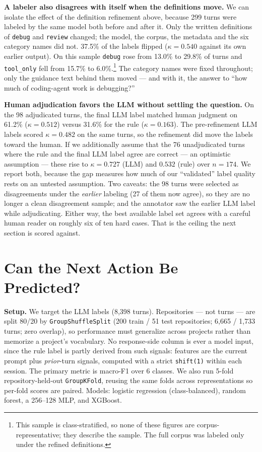 \documentclass[10pt]{article}
\begin{document}
\textbf{A labeler also disagrees with itself when the definitions move.} We can
isolate the effect of the definition refinement above, because 299 turns were
labeled by the same model both before and after it. Only the written definitions
of \texttt{debug} and \texttt{review} changed; the model, the corpus, the
metadata and the six category names did not. 37.5\% of the labels flipped
($\kappa = 0.540$ against its own earlier output). On this sample \texttt{debug}
rose from 13.0\% to 29.8\% of turns and \texttt{tool\_only} fell from 15.7\% to
6.0\%.\footnote{This sample is class-stratified, so none of these figures are
corpus-representative; they describe the sample. The full corpus was labeled
only under the refined definitions.} The category names were fixed throughout;
only the guidance text behind them moved --- and with it, the answer to ``how
much of coding-agent work is debugging?''

\textbf{Human adjudication favors the LLM without settling the question.} On the
98 adjudicated turns, the final LLM label matched human judgment on 61.2\%
($\kappa = 0.512$) versus 31.6\% for the rule ($\kappa = 0.163$). The
pre-refinement LLM labels scored $\kappa = 0.482$ on the same turns, so the
refinement did move the labels toward the human. If we additionally assume that
the 76 unadjudicated turns where the rule and the final LLM label agree are
correct --- an optimistic assumption --- these rise to $\kappa = 0.727$ (LLM) and
$0.532$ (rule) over $n = 174$. We report both, because the gap measures how much
of our ``validated'' label quality rests on an untested assumption. Two caveats:
the 98 turns were selected as disagreements under the \emph{earlier} labeling
(27 of them now agree), so they are no longer a clean disagreement sample; and
the annotator saw the earlier LLM label while adjudicating. Either way, the best
available label set agrees with a careful human reader on roughly six of ten
hard cases. That is the ceiling the next section is scored against.

\section{Can the Next Action Be Predicted?}

\textbf{Setup.} We target the LLM labels (8{,}398 turns). Repositories --- not
turns --- are split 80/20 by \texttt{GroupShuffleSplit} (200 train / 51 test
repositories; 6{,}665 / 1{,}733 turns; zero overlap), so performance must
generalize across projects rather than memorize a project's vocabulary. No
response-side column is ever a model input, since the rule label is partly
derived from such signals: features are the current prompt plus
\emph{prior}-turn signals, computed with a strict \texttt{shift(1)} within each
session. The primary metric is macro-F1 over 6 classes. We also run 5-fold
repository-held-out \texttt{GroupKFold}, reusing the same folds across
representations so per-fold scores are paired. Models: logistic regression
(class-balanced), random forest, a 256--128 MLP, and XGBoost.
\end{document}
